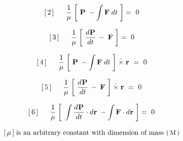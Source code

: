 \documentclass[10pt,fleqn]{article}
\begin{document}
\par \vspace{+0.15em}
\begin{eqnarray*}
\hspace{+1.17em} [\,2\,] \;\;\;\;\;\; \dfrac{1}{\mu} \; \bigg [ \,\, \mathbf{P} \; - \int \mathbf{F} \; d\hspace{+0.012em}t \,\, \bigg ] =~ 0
\end{eqnarray*}
\par \vspace{+0.15em}
\begin{eqnarray*}
\hspace{+1.17em} [\,3\,] \;\;\;\;\;\; \dfrac{1}{\mu} \; \bigg [ \,\, \dfrac{d\hspace{+0.045em}\mathbf{P}}{d\hspace{+0.012em}t} \, - \; \mathbf{F} \,\, \bigg ] =~ 0
\end{eqnarray*}
\par \vspace{+0.15em}
\begin{eqnarray*}
\hspace{+1.17em} [\,4\,] \;\;\;\;\;\; \dfrac{1}{\mu} \; \bigg [ \,\, \mathbf{P} \; - \int \mathbf{F} \; d\hspace{+0.012em}t \,\, \bigg ] \hspace{+0.24em}\dot{\times}\hspace{+0.30em} \mathbf{r} ~=~ 0
\end{eqnarray*}
\par \vspace{+0.15em}
\begin{eqnarray*}
\hspace{+1.17em} [\,5\,] \;\;\;\;\;\; \dfrac{1}{\mu} \; \bigg [ \,\, \dfrac{d\hspace{+0.045em}\mathbf{P}}{d\hspace{+0.012em}t} \, - \; \mathbf{F} \,\, \bigg ] \hspace{+0.24em}\dot{\times}\hspace{+0.30em} \mathbf{r} ~=~ 0
\end{eqnarray*}
\par \vspace{+0.15em}
\begin{eqnarray*}
\hspace{+1.17em} [\,6\,] \;\;\;\;\;\; \dfrac{1}{\mu} \; \bigg [ \,\, \int \dfrac{d\hspace{+0.045em}\mathbf{P}}{d\hspace{+0.012em}t} \cdot d\hspace{+0.036em}\mathbf{r} \; - \int \mathbf{F} \cdot d\hspace{+0.036em}\mathbf{r} \,\, \bigg ] =~ 0
\end{eqnarray*}
\par \vspace{+0.33em}
\begin{eqnarray*}
\hspace{+1.17em} [\,\mu\,] \; \textrm{is an arbitrary constant with dimension of mass {\small $( \, \mathrm{M} \, )$}}
\end{eqnarray*}
\end{document}
